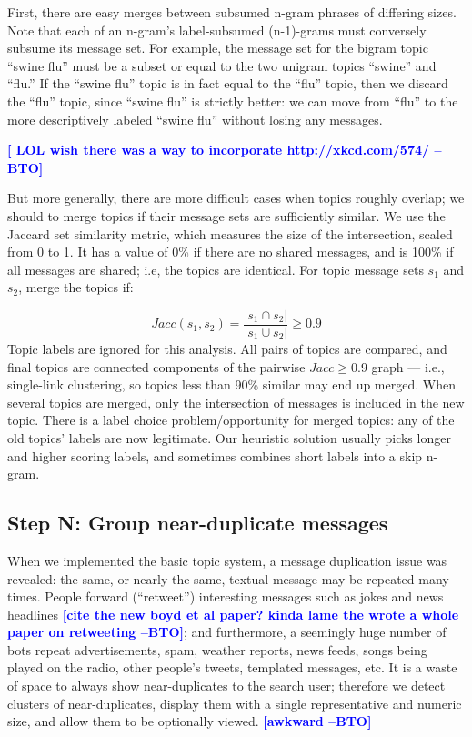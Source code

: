 \documentclass[letterpaper]{article}
\newcommand{\bto}[1]{\textcolor{blue}{\textbf{[#1 --BTO]}}}
\newcommand{\codenote}[1]{}
\begin{document}
First, there are easy merges between subsumed n-gram phrases of differing sizes.  Note that each of an n-gram's label-subsumed (n-1)-grams must conversely subsume its message set.  For example, the message set for the bigram topic ``swine flu'' must be a subset or equal to the two unigram topics ``swine'' and ``flu.''  If the ``swine flu'' topic is in fact equal to the ``flu'' topic, then we discard the ``flu'' topic, since ``swine flu'' is strictly better: we can move from ``flu'' to the more descriptively labeled ``swine flu'' without losing any messages.

\bto{ LOL wish there was a way to incorporate http://xkcd.com/574/ }

But more generally, there are more difficult cases when topics roughly overlap; we should to merge topics if their message sets are sufficiently similar.  We use the Jaccard set similarity metric, which measures the size of the intersection, scaled from 0 to 1.  It has a value of 0\% if there are no shared messages, and is 100\% if all messages are shared; i.e, the topics are identical.  For topic message sets $s_1$ and $s_2$, merge the topics if:

\[ Jacc(s_1,s_2) = \frac{ |s_1 \cap s_2| }{ |s_1 \cup s_2 | } \geq 0.9 
\]
Topic labels are ignored for this analysis.  All pairs of topics are compared, and final topics are connected components of the pairwise $Jacc \geq 0.9$ graph --- i.e., single-link clustering, so topics less than 90\% similar may end up merged.  When several topics are merged, only the intersection of messages is included in the new topic.  There is a label choice problem/opportunity for merged topics: any of the old topics' labels are now legitimate.  Our heuristic solution usually picks longer and higher scoring labels, and sometimes combines short labels into a skip n-gram.

\subsection{Step N: Group near-duplicate messages}

\codenote{ deduper.py }
When we implemented the basic topic system, a message duplication issue was revealed: the same, or nearly the same, textual message may be repeated many times.  People forward (``retweet'') interesting messages such as jokes and news headlines \bto{cite the new boyd et al paper?  kinda lame the wrote a whole paper on retweeting}; and furthermore, a seemingly huge number of bots repeat advertisements, spam, weather reports, news feeds, songs being played on the radio, other people's tweets, templated messages, etc.  It is a waste of space to always show near-duplicates to the search user; therefore we detect clusters of near-duplicates, display them with a single representative and numeric size, and allow them to be optionally viewed.  \bto{awkward}
\end{document}
